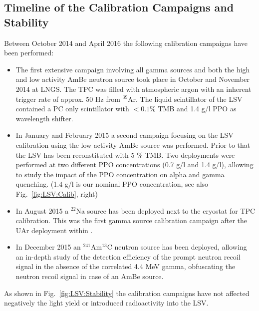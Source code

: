 \subsection{Timeline of the Calibration Campaigns and Stability}
Between October 2014 and April 2016 the following calibration campaigns have been performed:
\begin{itemize}
\item The first extensive campaign involving all gamma sources and both the high and low activity AmBe neutron source took place in October and November 2014 at LNGS. The TPC was filled with atmospheric argon with an inherent trigger rate of approx. 50 Hz from $^{39}$Ar. The liquid scintillator of the LSV contained a PC only scintillator with $<0.1 \%$ TMB and 1.4 g/l PPO as wavelength shifter.

\item In January and February 2015 a second campaign focusing on the LSV calibration using the low activity AmBe source was performed. Prior to that the LSV has been reconstituted with 5 \% TMB. Two deployments were performed at two different PPO concentrations (0.7 g/l and 1.4 g/l), allowing to study the impact of the PPO concentration on alpha and gamma quenching. (1.4 g/l is our nominal PPO concentration, see also Fig.~\ref{fig:LSV:Calib}, right)

\item In August 2015 a $^{22}$Na source has been deployed next to the cryostat for TPC calibration. This was the first gamma source calibration campaign after the UAr deployment within \dsf.
\item In December 2015 an $^{241}$Am$^{13}$C neutron source has been deployed, allowing an in-depth study of the detection efficiency of the prompt neutron recoil signal in the absence of the correlated 4.4 MeV gamma, obfuscating the neutron recoil signal in case of an AmBe source.
\end{itemize}

As shown in Fig.~\ref{fig:LSV:Stability} the calibration campaigns have not affected negatively the light yield or introduced radioactivity into the LSV.


